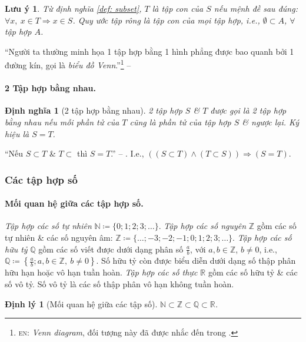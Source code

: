\documentclass{article}
\numberwithin{equation}{section}
\newtheorem{definition}{Định nghĩa}[section]
\newtheorem{theorem}{Định lý}[section]
\newtheorem{remark}{Lưu ý}[section]
\begin{document}
\begin{remark}
	Từ định nghĩa \ref{def: subset}, $T$ là tập con của $S$ nếu mệnh đề sau đúng: $\forall x,\ x\in T\Rightarrow x\in S$. Quy ước tập rông là tập con của mọi tập hợp, i.e., $\emptyset\subset A$, $\forall$ tập hợp $A$.
\end{remark}
``Người ta thường minh họa 1 tập hợp bằng 1 hình phẳng được bao quanh bởi 1 đường kín, gọi là \textit{biểu đồ Venn}.''\footnote{\textsc{en}: \textit{Venn diagram}, đối tượng này đã được nhắc đến trong \cite{Thai_Anh_Dat_Ha_Loan_Nam_Quang_Toan_6_tap_1}.} -- \cite[p. 14]{Khoai_Anh_Tan_Thang_Anh_Cuong_Duong_Dang_Ha_Hanh_Hong_Son_Tuan_Vuong_Toan_10_tap_1}

\paragraph{2 Tập hợp bằng nhau.}
\begin{definition}[2 tập hợp bằng nhau]
	2 tập hợp $S$ \& $T$ được gọi là \emph{2 tập hợp bằng nhau} nếu mỗi phần tử của $T$ cũng là phần tử của tập hợp $S$ \& ngược lại. Ký hiệu là $S = T$.
\end{definition}
``Nếu $S\subset T$ \& $T\subset $ thì $S = T$.'' -- \cite[p. 14]{Khoai_Anh_Tan_Thang_Anh_Cuong_Duong_Dang_Ha_Hanh_Hong_Son_Tuan_Vuong_Toan_10_tap_1}. I.e., $((S\subset T)\land(T\subset S))\Rightarrow(S = T)$.

\subsubsection{Các tập hợp số}

\paragraph{Mối quan hệ giữa các tập hợp số.} \textit{Tập hợp các số tự nhiên} $\mathbb{N}\coloneqq\{0;1;2;3;\ldots\}$. \textit{Tập hợp các số nguyên} $\mathbb{Z}$ gồm các số tự nhiên \& các số nguyên âm: $\mathbb{Z}\coloneqq\{\ldots;-3;-2;-1;0;1;2;3;\ldots\}$. \textit{Tập hợp các số hữu tỷ} $\mathbb{Q}$ gồm các số viết được dưới dạng phân số $\frac{a}{b}$, với $a,b\in\mathbb{Z}$, $b\ne 0$, i.e., $\mathbb{Q}\coloneqq\left\{\frac{a}{b};a,b\in\mathbb{Z},\ b\ne 0\right\}$. Số hữu tỷ còn được biểu diễn dưới dạng số thập phân hữu hạn hoặc vô hạn tuần hoàn. \textit{Tập hợp các số thực $\mathbb{R}$} gồm các số hữu tỷ \& các số vô tỷ. Số vô tỷ là các số thập phân vô hạn không tuần hoàn.

\begin{theorem}[Mối quan hệ giữa các tập số]
	$\mathbb{N}\subset\mathbb{Z}\subset\mathbb{Q}\subset\mathbb{R}$.
\end{theorem}
\end{document}
